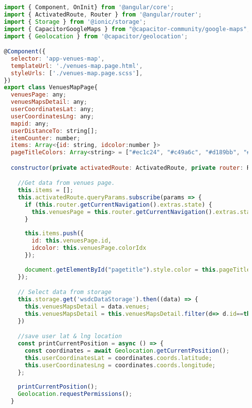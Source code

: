 \begin{lstlisting}[language=JavaScript, label={lst:venues-map.page.ts}, caption=venues-map.page.ts]
import { Component, OnInit} from '@angular/core';
import { ActivatedRoute, Router } from '@angular/router';
import { Storage } from '@ionic/storage';
import { CapacitorGoogleMaps } from "@capacitor-community/google-maps";
import { Geolocation } from '@capacitor/geolocation';

@Component({
  selector: 'app-venues-map',
  templateUrl: './venues-map.page.html',
  styleUrls: ['./venues-map.page.scss'],
})
export class VenuesMapPage{
  venuesPage: any;
  venuesMapsDetail: any;
  userCoordinatesLat: any;
  userCoordinatesLng: any;
  mapid: any;
  userDistanceTo: string[];
  itemCounter: number;
  items: Array<{id: string, idcolor:number }>
  pageTitleColors: Array<string> = ["#ec1c24", "#c49a6c", "#d189bb", "#4d113f"];

  constructor(private activatedRoute: ActivatedRoute, private router: Router,private storage: Storage) {

    //Get data from venues page.
    this.items = [];
    this.activatedRoute.queryParams.subscribe(params => {
      if (this.router.getCurrentNavigation().extras.state) {
        this.venuesPage = this.router.getCurrentNavigation().extras.state.venuesData;
      }
      
      this.items.push({
        id: this.venuesPage.id,
        idcolor: this.venuesPage.colorIdx
      });
      
      document.getElementById("pagetitle").style.color = this.pageTitleColors[this.items[0].idcolor-1];
    });

    // Select data from storage
    this.storage.get('wsdcDataStorage').then((data) => {
      this.venuesMapsDetail = data.venues;
      this.venuesMapsDetail = this.venuesMapsDetail.filter(d=> d.id==this.items[0].id);
    })

    //save user lat & lng location
    const printCurrentPosition = async () => {
      const coordinates = await Geolocation.getCurrentPosition();
      this.userCoordinatesLat = coordinates.coords.latitude;
      this.userCoordinatesLng = coordinates.coords.longitude;
    };
    
    printCurrentPosition();
    Geolocation.requestPermissions();
  }


\end{lstlisting}
